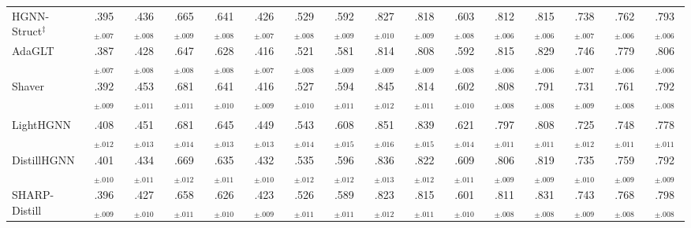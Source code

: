 \documentclass[10pt]{article}
\theoremstyle{plain}
\newcommand{\cg}[1]{\cellcolor{tierBonf}#1}
\newcommand{\cb}[1]{\cellcolor{tier01}#1}
\newcommand{\co}[1]{\cellcolor{tier05}#1}
\theoremstyle{definition}
\begin{document}
\begin{table}
\begin{tabular}{l ccccc ccccc ccccc}
HGNN-Struct$^{\ddagger}$
 & \cg{.395$_{\pm.007}$} & \cg{.436$_{\pm.008}$} & \cg{.665$_{\pm.009}$} & \cg{.641$_{\pm.008}$} & \cg{.426$_{\pm.007}$}
 & \cg{.529$_{\pm.008}$} & \cg{.592$_{\pm.009}$} & \cg{.827$_{\pm.010}$} & \cg{.818$_{\pm.009}$} & \cg{.603$_{\pm.008}$}
 & \cg{.812$_{\pm.006}$} & \cg{.815$_{\pm.006}$} & \cg{.738$_{\pm.007}$} & \cg{.762$_{\pm.006}$} & \cg{.793$_{\pm.006}$} \\
AdaGLT
 & \co{.387$_{\pm.007}$} & \cb{.428$_{\pm.008}$} & \co{.647$_{\pm.008}$} & \cb{.628$_{\pm.008}$} & \cb{.416$_{\pm.007}$}
 & \cb{.521$_{\pm.008}$} & \co{.581$_{\pm.009}$} & \cb{.814$_{\pm.009}$} & \cb{.808$_{\pm.009}$} & \co{.592$_{\pm.008}$}
 & \cg{.815$_{\pm.006}$} & \cg{.829$_{\pm.006}$} & \cb{.746$_{\pm.007}$} & \cb{.779$_{\pm.006}$} & \cb{.806$_{\pm.006}$} \\
Shaver
 & \cb{.392$_{\pm.009}$} & \cg{.453$_{\pm.011}$} & \cg{.681$_{\pm.011}$} & \cg{.641$_{\pm.010}$} & \cb{.416$_{\pm.009}$}
 & \cb{.527$_{\pm.010}$} & \cg{.594$_{\pm.011}$} & \cg{.845$_{\pm.012}$} & \cg{.814$_{\pm.011}$} & \cg{.602$_{\pm.010}$}
 & \cg{.808$_{\pm.008}$} & \cg{.791$_{\pm.008}$} & \cg{.731$_{\pm.009}$} & \cg{.761$_{\pm.008}$} & \cg{.792$_{\pm.008}$} \\
\midrule
\rowcolor{groupBar}\multicolumn{16}{l}{\textit{Knowledge distillation methods}} \\
LightHGNN
 & \cg{.408$_{\pm.012}$} & \cg{.451$_{\pm.013}$} & \cg{.681$_{\pm.014}$} & \cg{.645$_{\pm.013}$} & \cg{.449$_{\pm.013}$}
 & \cg{.543$_{\pm.014}$} & \cg{.608$_{\pm.015}$} & \cg{.851$_{\pm.016}$} & \cg{.839$_{\pm.015}$} & \cg{.621$_{\pm.014}$}
 & \cg{.797$_{\pm.011}$} & \cg{.808$_{\pm.011}$} & \cg{.725$_{\pm.012}$} & \cg{.748$_{\pm.011}$} & \cg{.778$_{\pm.011}$} \\
DistillHGNN
 & \cg{.401$_{\pm.010}$} & \cg{.434$_{\pm.011}$} & \cg{.669$_{\pm.012}$} & \cg{.635$_{\pm.011}$} & \cg{.432$_{\pm.010}$}
 & \cg{.535$_{\pm.012}$} & \cg{.596$_{\pm.012}$} & \cg{.836$_{\pm.013}$} & \cg{.822$_{\pm.012}$} & \cg{.609$_{\pm.011}$}
 & \cg{.806$_{\pm.009}$} & \cg{.819$_{\pm.009}$} & \cg{.735$_{\pm.010}$} & \cg{.759$_{\pm.009}$} & \cg{.792$_{\pm.009}$} \\
SHARP-Distill
 & \cg{.396$_{\pm.009}$} & \co{.427$_{\pm.010}$} & \cg{.658$_{\pm.011}$} & \co{.626$_{\pm.010}$} & \cg{.423$_{\pm.009}$}
 & \cg{.526$_{\pm.011}$} & \cg{.589$_{\pm.011}$} & \cg{.823$_{\pm.012}$} & \cg{.815$_{\pm.011}$} & \cg{.601$_{\pm.010}$}
 & \cg{.811$_{\pm.008}$} & \cb{.831$_{\pm.008}$} & \cg{.743$_{\pm.009}$} & \cg{.768$_{\pm.008}$} & \cg{.798$_{\pm.008}$} \\
\bottomrule
\end{tabular}
\end{table}
\end{document}
